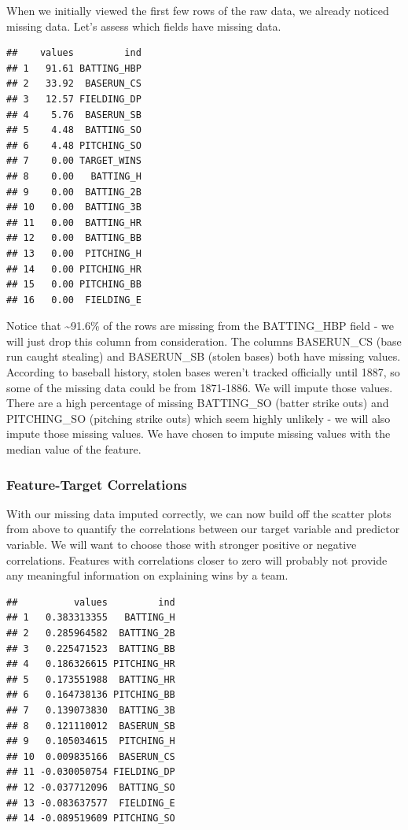 \documentclass[
]{article}
\begin{document}
When we initially viewed the first few rows of the raw data, we already
noticed missing data. Let's assess which fields have missing data.

\begin{verbatim}
##    values         ind
## 1   91.61 BATTING_HBP
## 2   33.92  BASERUN_CS
## 3   12.57 FIELDING_DP
## 4    5.76  BASERUN_SB
## 5    4.48  BATTING_SO
## 6    4.48 PITCHING_SO
## 7    0.00 TARGET_WINS
## 8    0.00   BATTING_H
## 9    0.00  BATTING_2B
## 10   0.00  BATTING_3B
## 11   0.00  BATTING_HR
## 12   0.00  BATTING_BB
## 13   0.00  PITCHING_H
## 14   0.00 PITCHING_HR
## 15   0.00 PITCHING_BB
## 16   0.00  FIELDING_E
\end{verbatim}

Notice that \textasciitilde91.6\% of the rows are missing from the
BATTING\_HBP field - we will just drop this column from consideration.
The columns BASERUN\_CS (base run caught stealing) and BASERUN\_SB
(stolen bases) both have missing values. According to baseball history,
stolen bases weren't tracked officially until 1887, so some of the
missing data could be from 1871-1886. We will impute those values. There
are a high percentage of missing BATTING\_SO (batter strike outs) and
PITCHING\_SO (pitching strike outs) which seem highly unlikely - we will
also impute those missing values. We have chosen to impute missing
values with the median value of the feature.

\hypertarget{feature-target-correlations}{%
\subsubsection{Feature-Target
Correlations}\label{feature-target-correlations}}

With our missing data imputed correctly, we can now build off the
scatter plots from above to quantify the correlations between our target
variable and predictor variable. We will want to choose those with
stronger positive or negative correlations. Features with correlations
closer to zero will probably not provide any meaningful information on
explaining wins by a team.

\begin{verbatim}
##          values         ind
## 1   0.383313355   BATTING_H
## 2   0.285964582  BATTING_2B
## 3   0.225471523  BATTING_BB
## 4   0.186326615 PITCHING_HR
## 5   0.173551988  BATTING_HR
## 6   0.164738136 PITCHING_BB
## 7   0.139073830  BATTING_3B
## 8   0.121110012  BASERUN_SB
## 9   0.105034615  PITCHING_H
## 10  0.009835166  BASERUN_CS
## 11 -0.030050754 FIELDING_DP
## 12 -0.037712096  BATTING_SO
## 13 -0.083637577  FIELDING_E
## 14 -0.089519609 PITCHING_SO
\end{verbatim}
\end{document}
